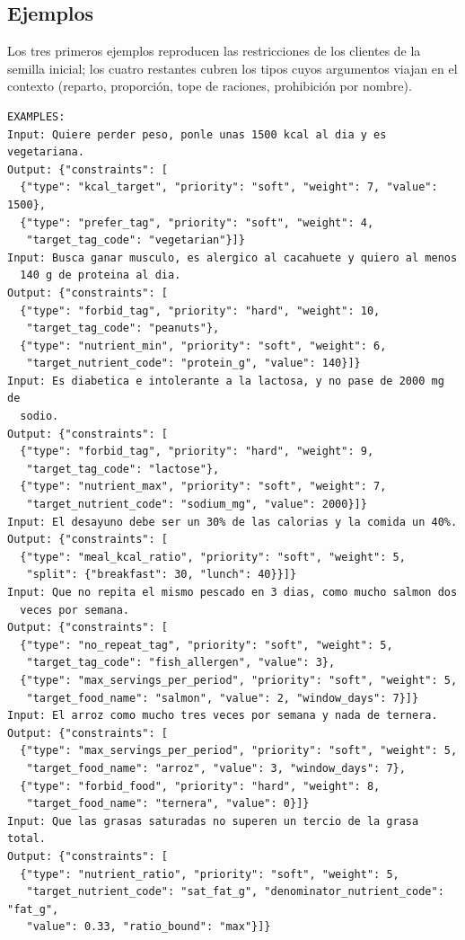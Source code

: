 \subsection*{Ejemplos}

Los tres primeros ejemplos reproducen las restricciones de los clientes de la semilla inicial; los cuatro restantes cubren los tipos cuyos argumentos viajan en el contexto (reparto, proporción, tope de raciones, prohibición por nombre).

\begin{footnotesize}
\begin{verbatim}
EXAMPLES:
Input: Quiere perder peso, ponle unas 1500 kcal al dia y es vegetariana.
Output: {"constraints": [
  {"type": "kcal_target", "priority": "soft", "weight": 7, "value": 1500},
  {"type": "prefer_tag", "priority": "soft", "weight": 4,
   "target_tag_code": "vegetarian"}]}
Input: Busca ganar musculo, es alergico al cacahuete y quiero al menos
  140 g de proteina al dia.
Output: {"constraints": [
  {"type": "forbid_tag", "priority": "hard", "weight": 10,
   "target_tag_code": "peanuts"},
  {"type": "nutrient_min", "priority": "soft", "weight": 6,
   "target_nutrient_code": "protein_g", "value": 140}]}
Input: Es diabetica e intolerante a la lactosa, y no pase de 2000 mg de
  sodio.
Output: {"constraints": [
  {"type": "forbid_tag", "priority": "hard", "weight": 9,
   "target_tag_code": "lactose"},
  {"type": "nutrient_max", "priority": "soft", "weight": 7,
   "target_nutrient_code": "sodium_mg", "value": 2000}]}
Input: El desayuno debe ser un 30% de las calorias y la comida un 40%.
Output: {"constraints": [
  {"type": "meal_kcal_ratio", "priority": "soft", "weight": 5,
   "split": {"breakfast": 30, "lunch": 40}}]}
Input: Que no repita el mismo pescado en 3 dias, como mucho salmon dos
  veces por semana.
Output: {"constraints": [
  {"type": "no_repeat_tag", "priority": "soft", "weight": 5,
   "target_tag_code": "fish_allergen", "value": 3},
  {"type": "max_servings_per_period", "priority": "soft", "weight": 5,
   "target_food_name": "salmon", "value": 2, "window_days": 7}]}
Input: El arroz como mucho tres veces por semana y nada de ternera.
Output: {"constraints": [
  {"type": "max_servings_per_period", "priority": "soft", "weight": 5,
   "target_food_name": "arroz", "value": 3, "window_days": 7},
  {"type": "forbid_food", "priority": "hard", "weight": 8,
   "target_food_name": "ternera", "value": 0}]}
Input: Que las grasas saturadas no superen un tercio de la grasa total.
Output: {"constraints": [
  {"type": "nutrient_ratio", "priority": "soft", "weight": 5,
   "target_nutrient_code": "sat_fat_g", "denominator_nutrient_code": "fat_g",
   "value": 0.33, "ratio_bound": "max"}]}
\end{verbatim}
\end{footnotesize}

